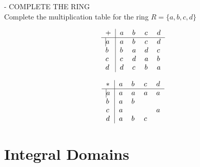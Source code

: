 \documentclass[12pt]{book}
\theoremstyle{definition}
\begin{document}
  - COMPLETE THE RING \\[.2in]
Complete the multiplication table for the ring $ R=\{a,b,c,d\} $

\begin{multicols}{2}
	
	\[
	\begin{tabular}{>{$}l<{$}|*{4}{>{$}l<{$}}}
	+   & a  & b   & c & d      \\
	\hline\vrule height 12pt width 0pt
	a   & a   & b  & c & d      \\
	b   & b   & a   & d   & c      \\
	c   & c   & d   & a   & b        \\
	d   & d  & c  & b & a      \\
	
	\end{tabular} 
	\]
	
	\columnbreak 
	
	\[
	\begin{tabular}{>{$}l<{$}|*{4}{>{$}l<{$}}}
	*   & a  & b   & c & d      \\
	\hline\vrule height 12pt width 0pt
	a   & a   & a  & a  & a      \\
	b   & a   & b  & ~   &       \\
	c   & a  & ~   & ~   & a        \\
	d   & a   & b   & c  & ~      \\
	
	\end{tabular} 
	\]
	
\end{multicols}

\section{Integral Domains}
\end{document}
